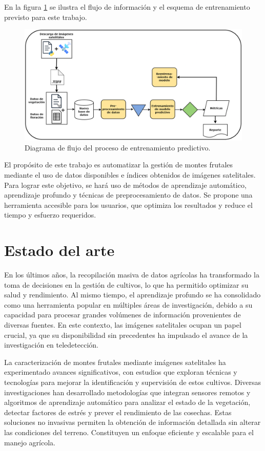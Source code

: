 En la figura \ref{fig:diagramatesis} se ilustra el flujo de información y el esquema de entrenamiento 
previsto para este trabajo.

\begin{figure}[h]
	\centering
	\includegraphics[width=\textwidth]{./Figures/flujo_tesis_tffa.png}
	\caption{Diagrama de flujo del proceso de entrenamiento predictivo.}
	\label{fig:diagramatesis}
\end{figure}


El propósito de este trabajo es automatizar la gestión de montes frutales mediante el 
uso de datos disponibles e índices obtenidos de imágenes satelitales. Para lograr este
objetivo, se hará uso de métodos de aprendizaje automático, aprendizaje profundo y 
técnicas de preprocesamiento de datos. Se propone una herramienta accesible para los 
usuarios, que optimiza los resultados y reduce el tiempo y esfuerzo requeridos.

\section{Estado del arte}

En los últimos años, la recopilación masiva de datos agrícolas ha transformado la 
toma de decisiones en la gestión de cultivos, lo que ha permitido optimizar su salud
y rendimiento. Al mismo tiempo, el aprendizaje profundo se ha consolidado como una
herramienta popular en múltiples áreas de investigación, debido a su capacidad para
procesar grandes volúmenes de información provenientes de diversas fuentes. En 
este contexto, las imágenes satelitales ocupan un papel crucial, ya que su 
disponibilidad sin precedentes ha impulsado el avance de la investigación en teledetección.

La caracterización de montes frutales mediante imágenes satelitales ha 
experimentado avances significativos, con estudios que exploran técnicas y
tecnologías para mejorar la identificación y supervisión de estos cultivos.
Diversas investigaciones han desarrollado metodologías que integran sensores 
remotos y algoritmos de aprendizaje automático para analizar el estado de la 
vegetación, detectar factores de estrés y prever el rendimiento de las cosechas. 
Estas soluciones no invasivas permiten la obtención de información detallada sin alterar 
las condiciones del terreno. Constituyen un enfoque eficiente y escalable para el manejo agrícola.

